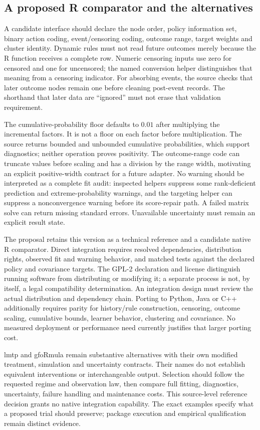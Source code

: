 \subsection{A proposed R comparator and the alternatives}

A candidate interface should declare the node order, policy information set,
binary action coding, event/censoring coding, outcome range, target weights
and cluster identity. Dynamic rules must not read future outcomes merely
because the R function receives a complete row. Numeric censoring inputs
use zero for censored and one for uncensored; the named conversion helper
distinguishes that meaning from a censoring indicator. For absorbing events,
the source checks that later outcome nodes remain one before cleaning
post-event records. The shorthand that later data are ``ignored'' must not
erase that validation requirement.~\citep{exec23_ltmle_source}

The cumulative-probability floor defaults to $0.01$ after multiplying the
incremental factors. It is not a floor on each factor before multiplication.
The source returns bounded and unbounded cumulative probabilities, which
support diagnostics; neither operation proves positivity. The outcome-range
code can truncate values before scaling and has a division by the range
width, motivating an explicit positive-width contract for a future adapter.
No warning should be interpreted as a complete fit audit: inspected helpers
suppress some rank-deficient prediction and extreme-probability warnings,
and the targeting helper can suppress a nonconvergence warning before its
score-repair path. A failed matrix solve can return missing standard errors.
Unavailable uncertainty must remain an explicit result state.
\citep{exec23_ltmle_source}

The proposal retains this version as a technical reference and a candidate
native R comparator. Direct integration requires resolved dependencies,
distribution rights, observed fit and warning behavior, and matched tests
against the declared policy and covariance targets. The GPL-2 declaration
and license distinguish running software from distributing or modifying it;
a separate process is not, by itself, a legal compatibility determination.
An integration design must review the actual distribution and dependency
chain. Porting to Python, Java or C++ additionally requires parity for
history/rule construction, censoring, outcome scaling, cumulative bounds,
learner behavior, clustering and covariance. No measured deployment or
performance need currently justifies that larger porting cost.
\citep{exec23_ltmle_source}

lmtp and gfoRmula remain substantive alternatives with their own modified
treatment, simulation and uncertainty contracts. Their names do not establish
equivalent interventions or interchangeable output. Selection should follow
the requested regime and observation law, then compare full fitting,
diagnostics, uncertainty, failure handling and maintenance costs. This
source-level reference decision grants no native integration capability.
The exact examples specify what a proposed trial should preserve; package
execution and empirical qualification remain distinct evidence.

